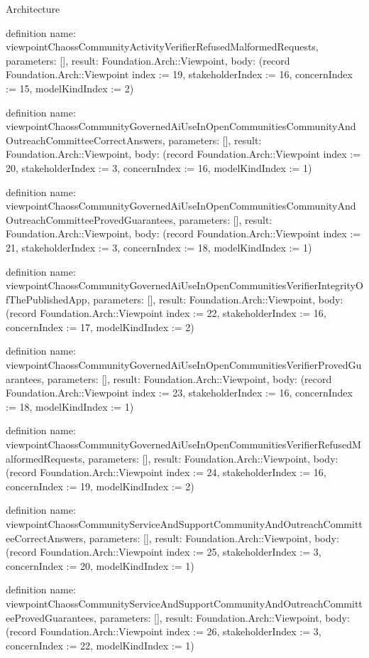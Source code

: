 \begin{lexlean}{Architecture}
\begin{semanticmodule}
definition{
  name: viewpointChaossCommunityActivityVerifierRefusedMalformedRequests,
  parameters: [],
  result: Foundation.Arch::Viewpoint,
  body: (record Foundation.Arch::Viewpoint {index := 19, stakeholderIndex := 16, concernIndex := 15, modelKindIndex := 2})
}

definition{
  name: viewpointChaossCommunityGovernedAiUseInOpenCommunitiesCommunityAndOutreachCommitteeCorrectAnswers,
  parameters: [],
  result: Foundation.Arch::Viewpoint,
  body: (record Foundation.Arch::Viewpoint {index := 20, stakeholderIndex := 3, concernIndex := 16, modelKindIndex := 1})
}

definition{
  name: viewpointChaossCommunityGovernedAiUseInOpenCommunitiesCommunityAndOutreachCommitteeProvedGuarantees,
  parameters: [],
  result: Foundation.Arch::Viewpoint,
  body: (record Foundation.Arch::Viewpoint {index := 21, stakeholderIndex := 3, concernIndex := 18, modelKindIndex := 1})
}

definition{
  name: viewpointChaossCommunityGovernedAiUseInOpenCommunitiesVerifierIntegrityOfThePublishedApp,
  parameters: [],
  result: Foundation.Arch::Viewpoint,
  body: (record Foundation.Arch::Viewpoint {index := 22, stakeholderIndex := 16, concernIndex := 17, modelKindIndex := 2})
}

definition{
  name: viewpointChaossCommunityGovernedAiUseInOpenCommunitiesVerifierProvedGuarantees,
  parameters: [],
  result: Foundation.Arch::Viewpoint,
  body: (record Foundation.Arch::Viewpoint {index := 23, stakeholderIndex := 16, concernIndex := 18, modelKindIndex := 1})
}

definition{
  name: viewpointChaossCommunityGovernedAiUseInOpenCommunitiesVerifierRefusedMalformedRequests,
  parameters: [],
  result: Foundation.Arch::Viewpoint,
  body: (record Foundation.Arch::Viewpoint {index := 24, stakeholderIndex := 16, concernIndex := 19, modelKindIndex := 2})
}

definition{
  name: viewpointChaossCommunityServiceAndSupportCommunityAndOutreachCommitteeCorrectAnswers,
  parameters: [],
  result: Foundation.Arch::Viewpoint,
  body: (record Foundation.Arch::Viewpoint {index := 25, stakeholderIndex := 3, concernIndex := 20, modelKindIndex := 1})
}

definition{
  name: viewpointChaossCommunityServiceAndSupportCommunityAndOutreachCommitteeProvedGuarantees,
  parameters: [],
  result: Foundation.Arch::Viewpoint,
  body: (record Foundation.Arch::Viewpoint {index := 26, stakeholderIndex := 3, concernIndex := 22, modelKindIndex := 1})
}


\end{semanticmodule}
\end{lexlean}
